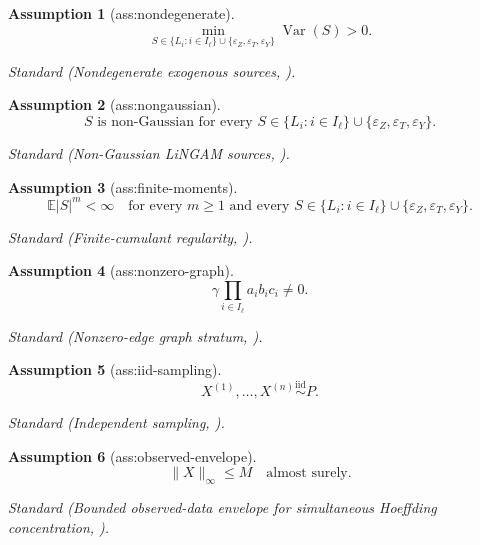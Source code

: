 \documentclass{article}
\newtheorem{assumption}{Assumption}
\begin{document}
\begin{assumption}[ass:nondegenerate]\label{ass:nondegenerate}
\[\min_{S\in\{L_i:i\in I_{\ell}\}\cup\{\varepsilon_Z,\varepsilon_T,\varepsilon_Y\}}\operatorname{Var}(S)>0.\]
\par\smallskip\noindent\emph{Standard} (Nondegenerate exogenous sources, \cite{TramontanoKivvaSalehkaleybarKiyavashDrton2025}).
\end{assumption}

\begin{assumption}[ass:nongaussian]\label{ass:nongaussian}
\[S\text{ is non-Gaussian for every }S\in\{L_i:i\in I_{\ell}\}\cup\{\varepsilon_Z,\varepsilon_T,\varepsilon_Y\}.\]
\par\smallskip\noindent\emph{Standard} (Non-Gaussian LiNGAM sources, \cite{TramontanoKivvaSalehkaleybarKiyavashDrton2025}).
\end{assumption}

\begin{assumption}[ass:finite-moments]\label{ass:finite-moments}
\[\mathbb E|S|^m<\infty\quad\text{for every }m\ge1\text{ and every }S\in\{L_i:i\in I_{\ell}\}\cup\{\varepsilon_Z,\varepsilon_T,\varepsilon_Y\}.\]
\par\smallskip\noindent\emph{Standard} (Finite-cumulant regularity, \cite{TramontanoKivvaSalehkaleybarKiyavashDrton2025}).
\end{assumption}

\begin{assumption}[ass:nonzero-graph]\label{ass:nonzero-graph}
\[\gamma\prod_{i\in I_{\ell}}a_ib_ic_i\ne0.\]
\par\smallskip\noindent\emph{Standard} (Nonzero-edge graph stratum, \cite{TramontanoKivvaSalehkaleybarKiyavashDrton2025}).
\end{assumption}

\begin{assumption}[ass:iid-sampling]\label{ass:iid-sampling}
\[X^{(1)},\ldots,X^{(n)}\overset{\mathrm{iid}}{\sim}P.\]
\par\smallskip\noindent\emph{Standard} (Independent sampling, \cite{Serfling1980}).
\end{assumption}

\begin{assumption}[ass:observed-envelope]\label{ass:observed-envelope}
\[\lVert X\rVert_{\infty}\le M\quad\text{almost surely}.\]
\par\smallskip\noindent\emph{Standard} (Bounded observed-data envelope for simultaneous Hoeffding concentration, \cite{Hoeffding1963}).
\end{assumption}
\end{document}
